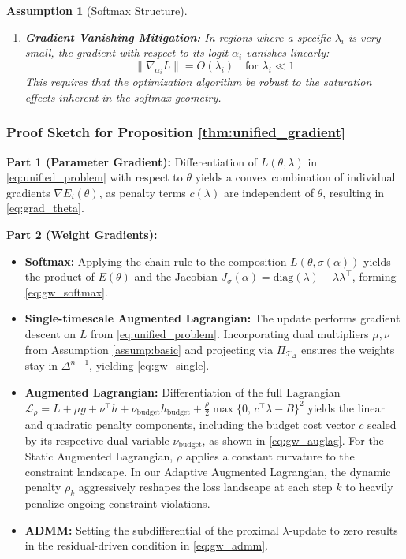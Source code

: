 \documentclass[preprint,12pt,authoryear]{elsarticle}
\newtheorem{assumption}{Assumption}
\begin{document}
\begin{assumption}[Softmax Structure]
\begin{enumerate}
    \item \textbf{Gradient Vanishing Mitigation:} In regions where a specific $\lambda_i$ is very small, the gradient with respect to its logit $\alpha_i$ vanishes linearly:
    \begin{equation}
        \|\nabla_{\alpha_i} L\| = O(\lambda_i) \quad \text{for } \lambda_i \ll 1
    \end{equation}
    This requires that the optimization algorithm be robust to the saturation effects inherent in the softmax geometry.
\end{enumerate}
\end{assumption}



\subsubsection{Proof Sketch for Proposition \ref{thm:unified_gradient}} \label{appendix:unified_gradient}

\textbf{Part 1 (Parameter Gradient):} Differentiation of $L(\theta, \lambda)$ in \eqref{eq:unified_problem} with respect to $\theta$ yields a convex combination of individual gradients $\nabla E_i(\theta)$, as penalty terms $c(\lambda)$ are independent of $\theta$, resulting in \eqref{eq:grad_theta}.

\textbf{Part 2 (Weight Gradients):}
\begin{itemize}
    \item \textbf{Softmax:} Applying the chain rule to the composition $L(\theta, \sigma(\alpha))$ yields the product of $E(\theta)$ and the Jacobian $J_\sigma(\alpha) = \text{diag}(\lambda) - \lambda\lambda^\top$, forming \eqref{eq:gw_softmax}.
    \item \textbf{Single-timescale Augmented Lagrangian:} The update performs gradient descent on $L$ from \eqref{eq:unified_problem}. Incorporating dual multipliers $\mu, \nu$ from Assumption \ref{assump:basic} and projecting via $\Pi_{\mathcal{T}_\Delta}$ ensures the weights stay in $\Delta^{n-1}$, yielding \eqref{eq:gw_single}.
    \item \textbf{Augmented Lagrangian:} Differentiation of the full Lagrangian $\mathcal{L}_\rho = L + \mu g + \nu^\top h + \nu_{\text{budget}} h_{\text{budget}} + \tfrac{\rho}{2}\max\{0,\,c^\top\lambda - B\}^2$ yields the linear and quadratic penalty components, including the budget cost vector $c$ scaled by its respective dual variable $\nu_{\text{budget}}$, as shown in \eqref{eq:gw_auglag}. For the Static Augmented Lagrangian, $\rho$ applies a constant curvature to the constraint landscape. In our Adaptive Augmented Lagrangian, the dynamic penalty $\rho_k$ aggressively reshapes the loss landscape at each step $k$ to heavily penalize ongoing constraint violations.
    
    \item \textbf{ADMM:} Setting the subdifferential of the proximal $\lambda$-update to zero results in the residual-driven condition in \eqref{eq:gw_admm}.
\end{itemize}
\end{document}
